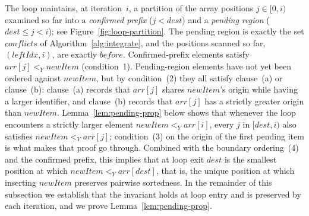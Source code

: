 \documentclass[sigplan,screen]{acmart}
\newcommand{\YjsLt}{\mathrel{<_Y}}
\begin{document}
\noindent
The loop maintains, at iteration~$i$, a partition of the array positions
$j \in [0, i)$ examined so far into a \emph{confirmed prefix}
($j < \mathit{dest}$) and a \emph{pending region}
($\mathit{dest} \leq j < i$); see Figure~\ref{fig:loop-partition}.
The pending region is exactly the set $\mathit{conflicts}$ of
Algorithm~\ref{alg:integrate}, and the positions scanned so far,
$(\mathit{leftIdx}, i)$, are exactly $\mathit{before}$.
Confirmed-prefix elements satisfy
$\mathit{arr}[j] \YjsLt \mathit{newItem}$ (condition~1).  Pending-region
elements have not yet been ordered against $\mathit{newItem}$, but by
condition~(2) they all satisfy clause~(a) or clause~(b): clause~(a)
records that $\mathit{arr}[j]$ shares $\mathit{newItem}$'s origin while
having a larger identifier, and clause~(b) records that $\mathit{arr}[j]$
has a strictly greater origin than $\mathit{newItem}$.
Lemma~\ref{lem:pending-prop} below shows that whenever the loop
encounters a strictly larger element
$\mathit{newItem} \YjsLt \mathit{arr}[i]$, every $j$ in
$[\mathit{dest}, i)$ also satisfies
$\mathit{newItem} \YjsLt \mathit{arr}[j]$; condition~(3) on the
origin of the first pending item is what makes that proof go through.  Combined with the
boundary ordering~(4) and the confirmed prefix, this implies that at
loop exit $\mathit{dest}$ is the smallest position at which
$\mathit{newItem} \YjsLt \mathit{arr}[\mathit{dest}]$, that is, the
unique position at which inserting $\mathit{newItem}$ preserves
pairwise sortedness.  In the remainder of this subsection we establish
that the invariant holds at loop entry and is preserved by each
iteration, and we prove Lemma~\ref{lem:pending-prop}.
\end{document}
